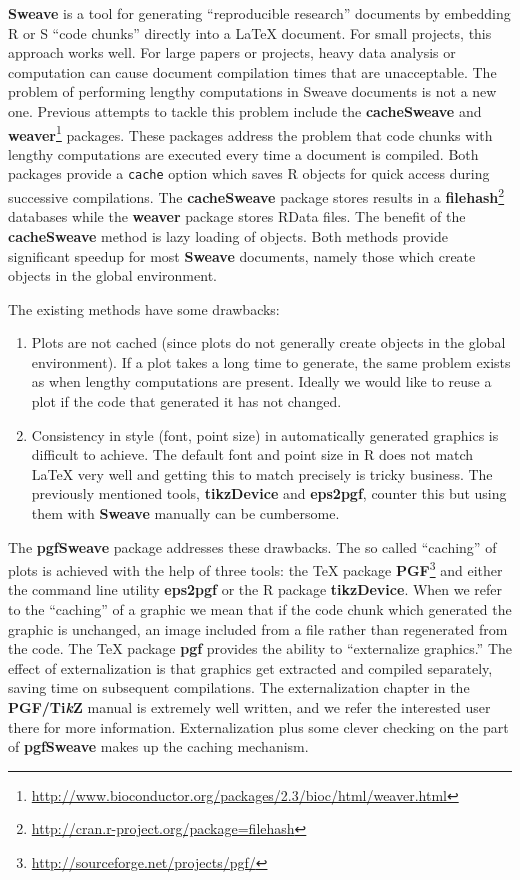 \documentclass{article}
\newcommand{\lang}{\textsf}
\newcommand{\code}{\texttt}
\newcommand{\pkg}{\textbf}
\begin{document}
\pkg{Sweave} is a tool for generating ``reproducible research'' documents by embedding \lang{R} or \lang{S} ``code chunks'' directly into a \LaTeX{} document.  For small projects, this approach works well.  For large papers or projects, heavy data analysis or computation can cause document compilation times that are unacceptable.  The problem of performing lengthy computations in Sweave documents is not a new one.  Previous attempts to tackle this problem include the \pkg{cacheSweave} and \pkg{weaver}\footnote{\url{http://www.bioconductor.org/packages/2.3/bioc/html/weaver.html}} packages.  These packages address the problem that code chunks with lengthy computations are executed every time a document is compiled.  Both packages provide a \code{cache} option which saves R objects for quick access during successive compilations. The \pkg{cacheSweave} package stores results in a \pkg{filehash}\footnote{\url{http://cran.r-project.org/package=filehash}} databases while the \pkg{weaver} package stores RData files.  The benefit of the \pkg{cacheSweave} method is lazy loading of objects.  Both methods provide significant speedup for most \pkg{Sweave} documents, namely those which create objects in the global environment.

The existing methods have some drawbacks:

\begin{enumerate} 
\item Plots are not cached (since plots do not generally create objects in the global environment). If a plot takes a long time to generate, the same problem exists as when lengthy computations are present.  Ideally we would like to reuse a plot if the code that generated it has not changed. 
\item Consistency in style (font, point size) in automatically generated graphics is difficult to achieve.  The default font and point size in \lang{R} does not match \LaTeX{} very well and getting this to match precisely is tricky business.  The previously mentioned tools, \pkg{tikzDevice} and \pkg{eps2pgf}, counter this but using them with \pkg{Sweave} manually can be cumbersome.
\end{enumerate}

The \pkg{pgfSweave} package addresses these drawbacks.  The so called ``caching'' of plots is achieved with the help of three tools: the \TeX{} package \pkg{PGF}\footnote{\url{http://sourceforge.net/projects/pgf/}}  and either the command line utility \pkg{eps2pgf} or the \lang{R} package \pkg{tikzDevice}.  When we refer to the ``caching'' of a graphic we mean that if the code chunk which generated the graphic is unchanged, an image included from a file rather than regenerated from the code.  The \TeX{} package \pkg{pgf} provides the ability to ``externalize graphics.''  The effect of externalization is that graphics get extracted and compiled separately, saving time on subsequent compilations.  The externalization chapter in the \pkg {PGF/Ti\textit{k}Z} manual is extremely well written, and we refer the interested user there for more information.  Externalization plus some clever checking on the part of \pkg{pgfSweave} makes up the caching mechanism.  
\end{document}
